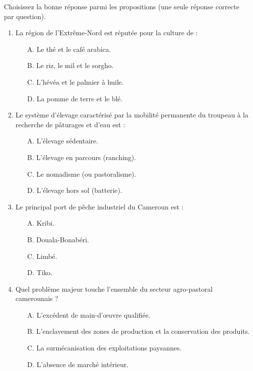 \documentclass[11pt]{article}
\begin{document}
\begin{exercice}
Choisissez la bonne réponse parmi les propositions (une seule réponse correcte par question).
\begin{enumerate}
    \item La région de l'Extrême-Nord est réputée pour la culture de :
    \begin{itemize}
        \item[A.] Le thé et le café arabica.
        \item[B.] Le riz, le mil et le sorgho.
        \item[C.] L'hévéa et le palmier à huile.
        \item[D.] La pomme de terre et le blé.
    \end{itemize}
    \item Le système d'élevage caractérisé par la mobilité permanente du troupeau à la recherche de pâturages et d'eau est :
    \begin{itemize}
        \item[A.] L'élevage sédentaire.
        \item[B.] L'élevage en parcours (ranching).
        \item[C.] Le nomadisme (ou pastoralisme).
        \item[D.] L'élevage hors sol (batterie).
    \end{itemize}
    \item Le principal port de pêche industriel du Cameroun est :
    \begin{itemize}
        \item[A.] Kribi.
        \item[B.] Douala-Bonabéri.
        \item[C.] Limbé.
        \item[D.] Tiko.
    \end{itemize}
    \item Quel problème majeur touche l'ensemble du secteur agro-pastoral camerounais ?
    \begin{itemize}
        \item[A.] L'excédent de main-d'œuvre qualifiée.
        \item[B.] L'enclavement des zones de production et la conservation des produits.
        \item[C.] La surmécanisation des exploitations paysannes.
        \item[D.] L'absence de marché intérieur.
    \end{itemize}
\end{enumerate}
\end{exercice}
\end{document}
